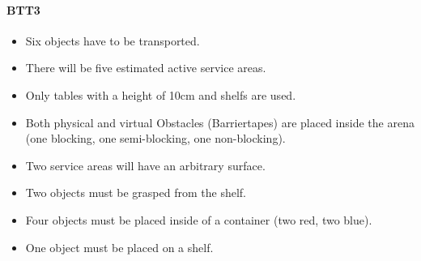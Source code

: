 \paragraph{BTT3}
\begin{itemize}
\item Six objects have to be transported.
\item There will be five estimated active service areas.
\item Only tables with a height of 10cm and shelfs are used.
\item Both physical and virtual Obstacles (Barriertapes) are placed inside the arena (one blocking, one semi-blocking, one non-blocking).
\item Two service areas will have an arbitrary surface.
\item Two objects must be grasped from the shelf.
\item Four objects must be placed inside of a container (two red, two blue). 
\item One object must be placed on a shelf.
\end{itemize}



